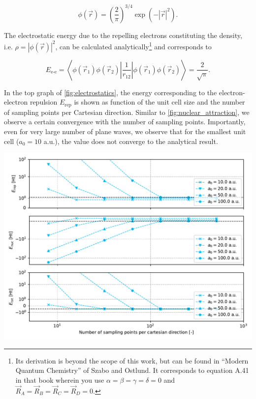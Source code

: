 \begin{equation}
    \phi(\vec{r}) = \left(\frac{2}{\pi} \right)^{3/4} \exp \left(-|\vec{r}|^{2} \right).
\end{equation}

The electrostatic energy due to the repelling electrons constituting the density, i.e. $\rho = |\phi(\vec{r})|^{2}$, can be calculated analytically\footnote{Its derivation is beyond the scope of this work, but can be found in ``Modern Quantum Chemistry'' of Szabo and Ostlund. It corresponds to equation A.41 in that book wherein you use $\alpha=\beta=\gamma=\delta=0$ and $\vec{R}_{A}=\vec{R}_{B}=\vec{R}_{C}=\vec{R}_{D}=0$.} and corresponds to

\begin{equation}
    E_{\text{e-e}} = \left<\phi(\vec{r}_{1})\phi(\vec{r}_{2})\left|\frac{1}{r_{12}}\right|\phi(\vec{r}_{1})\phi(\vec{r}_{2})\right> = \frac{2}{\sqrt{\pi}}.
\end{equation}

In the top graph of \cref{fig:electrostatics}, the energy corresponding to the electron-electron repulsion $E_{\text{rep}}$ is shown as function of the unit cell size and the number of sampling points per Cartesian direction. Similar to \cref{fig:nuclear_attraction}, we observe a certain convergence with the number of sampling points. Importantly, even for very large number of plane waves, we observe that for the smallest unit cell ($a_{0} = 10$ a.u.), the value does not converge to the analytical result.

\begin{Figure}
    \centering
    \includegraphics[width=\linewidth]{img/fig6_electrostatics.pdf}
    \label{fig:electrostatics}
\end{Figure}

